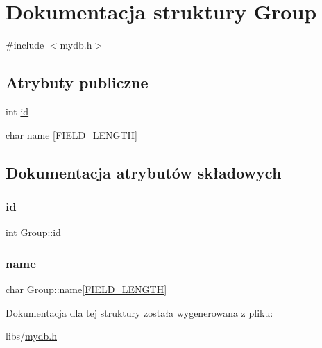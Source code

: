 \hypertarget{structGroup}{}\section{Dokumentacja struktury Group}
\label{structGroup}


{\ttfamily \#include $<$mydb.\+h$>$}

\subsection*{Atrybuty publiczne}
\begin{DoxyCompactItemize}
\item 
int \mbox{\hyperlink{structGroup_a17d525d2b48bedb61f8d3dbf182986f4}{id}}
\item 
char \mbox{\hyperlink{structGroup_a66567a396722dddec6e717ffdb09e811}{name}} \mbox{[}\mbox{\hyperlink{mydb_8h_a4e8ecaf2d59499a8c159ccdf7be1baec}{F\+I\+E\+L\+D\+\_\+\+L\+E\+N\+G\+TH}}\mbox{]}
\end{DoxyCompactItemize}


\subsection{Dokumentacja atrybutów składowych}
\mbox{\label{structGroup_a17d525d2b48bedb61f8d3dbf182986f4}} 
\subsubsection{\texorpdfstring{id}{id}}
{\footnotesize\ttfamily int Group\+::id}

\mbox{\label{structGroup_a66567a396722dddec6e717ffdb09e811}} 
\subsubsection{\texorpdfstring{name}{name}}
{\footnotesize\ttfamily char Group\+::name\mbox{[}\mbox{\hyperlink{mydb_8h_a4e8ecaf2d59499a8c159ccdf7be1baec}{F\+I\+E\+L\+D\+\_\+\+L\+E\+N\+G\+TH}}\mbox{]}}



Dokumentacja dla tej struktury została wygenerowana z pliku\+:\begin{DoxyCompactItemize}
\item 
libs/\mbox{\hyperlink{mydb_8h}{mydb.\+h}}\end{DoxyCompactItemize}
